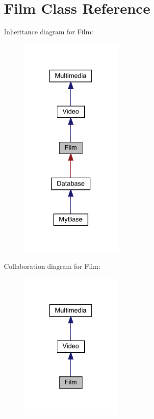 \hypertarget{class_film}{}\section{Film Class Reference}
\label{class_film}


Inheritance diagram for Film\+:
\nopagebreak
\begin{figure}[H]
\begin{center}
\leavevmode
\includegraphics[width=144pt]{class_film__inherit__graph}
\end{center}
\end{figure}


Collaboration diagram for Film\+:
\nopagebreak
\begin{figure}[H]
\begin{center}
\leavevmode
\includegraphics[width=144pt]{class_film__coll__graph}
\end{center}
\end{figure}
